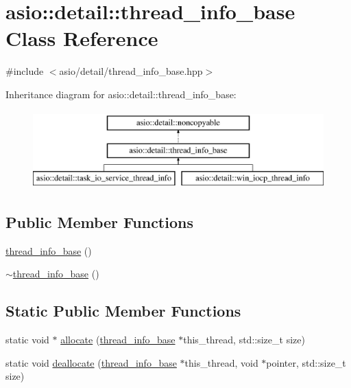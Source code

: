 \hypertarget{classasio_1_1detail_1_1thread__info__base}{}\section{asio\+:\+:detail\+:\+:thread\+\_\+info\+\_\+base Class Reference}
\label{classasio_1_1detail_1_1thread__info__base}


{\ttfamily \#include $<$asio/detail/thread\+\_\+info\+\_\+base.\+hpp$>$}

Inheritance diagram for asio\+:\+:detail\+:\+:thread\+\_\+info\+\_\+base\+:\begin{figure}[H]
\begin{center}
\leavevmode
\includegraphics[height=3.000000cm]{classasio_1_1detail_1_1thread__info__base}
\end{center}
\end{figure}
\subsection*{Public Member Functions}
\begin{DoxyCompactItemize}
\item 
\hyperlink{classasio_1_1detail_1_1thread__info__base_ae90db13f4b48a761a8a76701297e5902}{thread\+\_\+info\+\_\+base} ()
\item 
\hyperlink{classasio_1_1detail_1_1thread__info__base_adec30066279a8b188f26e0b71e3c6a6e}{$\sim$thread\+\_\+info\+\_\+base} ()
\end{DoxyCompactItemize}
\subsection*{Static Public Member Functions}
\begin{DoxyCompactItemize}
\item 
static void $\ast$ \hyperlink{classasio_1_1detail_1_1thread__info__base_ad4357bbddf312d73fae535e716b5dad4}{allocate} (\hyperlink{classasio_1_1detail_1_1thread__info__base}{thread\+\_\+info\+\_\+base} $\ast$this\+\_\+thread, std\+::size\+\_\+t size)
\item 
static void \hyperlink{classasio_1_1detail_1_1thread__info__base_a565e3430cbcb313243df1bcfb4ab8d7b}{deallocate} (\hyperlink{classasio_1_1detail_1_1thread__info__base}{thread\+\_\+info\+\_\+base} $\ast$this\+\_\+thread, void $\ast$pointer, std\+::size\+\_\+t size)
\end{DoxyCompactItemize}


